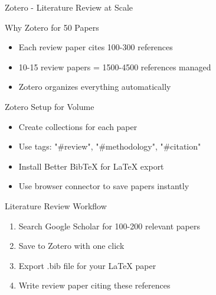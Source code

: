 \documentclass[11pt]{beamer}
\begin{document}
	\begin{frame}{Zotero - Literature Review at Scale}
		\scriptsize
		\begin{block}{Why Zotero for 50 Papers}
			\begin{itemize}
				\item Each review paper cites 100-300 references
				\item 10-15 review papers = 1500-4500 references managed
				\item Zotero organizes everything automatically
			\end{itemize}
		\end{block}
		\begin{block}{Zotero Setup for Volume}
			\begin{itemize}
				\item Create collections for each paper
				\item Use tags: "#review", "#methodology", "#citation"
				\item Install Better BibTeX for LaTeX export
				\item Use browser connector to save papers instantly
			\end{itemize}
		\end{block}
		\begin{block}{Literature Review Workflow}
			\begin{enumerate}
				\item Search Google Scholar for 100-200 relevant papers
				\item Save to Zotero with one click
				\item Export .bib file for your LaTeX paper
				\item Write review paper citing these references
			\end{enumerate}
		\end{block}
	\end{frame}
	
\end{document}
